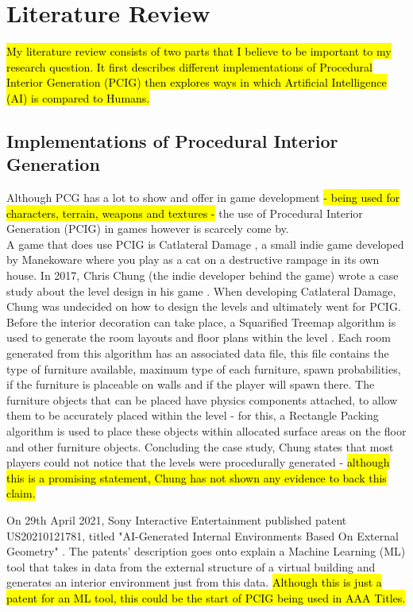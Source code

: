 \section{Literature Review}
\hl{My literature review consists of two parts that I believe to be important to my research question. It first describes different implementations of Procedural Interior Generation (PCIG) then explores ways in which Artificial Intelligence (AI) is compared to Humans.}

\subsection{Implementations of Procedural Interior Generation}
Although PCG has a lot to show and offer in game development \hl{- being used for characters, terrain, weapons and textures -} the use of Procedural Interior Generation (PCIG) in games however is scarcely come by.
\\
A game that does use PCIG is Catlateral Damage \cite{game:catlateral},
a small indie game developed by Manekoware where you play as a cat on a destructive rampage 
in its own house. In 2017, Chris Chung (the indie developer behind the game) wrote a case study about the level design in his game \cite{what-is-pcg}. When developing Catlateral Damage, Chung was undecided on how to design the levels and ultimately went for PCIG\cite{pcg_in_gd}. Before the interior decoration can take place, a Squarified Treemap algorithm is used to generate the room layouts and floor plans within the level \cite{squarified-treemap}. Each room generated from this algorithm has an associated data file, this file contains the type of furniture available, maximum type of each furniture, spawn probabilities, if the furniture is placeable on walls and if the player will spawn there. The furniture objects that can be placed have physics components attached, to allow them to be accurately placed within the level - for this, a Rectangle Packing algorithm is used to place these objects within allocated surface areas on the floor and other furniture objects. Concluding the case study, Chung states that most players could not notice that the levels were procedurally generated - \hl{although this is a promising statement, Chung has not shown any evidence to back this claim.}

\bigskip
On 29th April 2021, Sony Interactive Entertainment published patent US20210121781, titled "AI-Generated Internal Environments Based On External Geometry" \cite{sony-patent}. The patents' description goes onto explain a Machine Learning (ML) tool that takes in data from the external structure of a virtual building and generates an interior environment just from this data. \hl{Although this is just a patent for an ML tool, this could be the start of PCIG being used in AAA Titles. }
\bigskip


